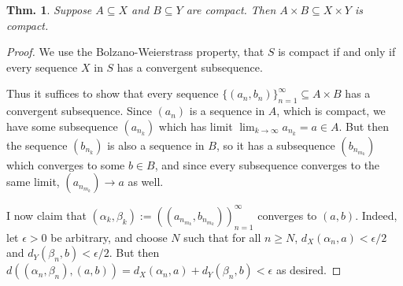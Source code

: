 \documentclass[12pt, a4paper]{book}
\newtheorem{theorem}{Thm.}[section]
\theoremstyle{nonumberplain}
\newtheorem{proof}{Proof}
\begin{document}
\begin{theorem}
    Suppose $A\subseteq X$ and $B\subseteq Y$ are compact.
    Then $A\times B\subseteq X\times Y$ is compact.
\end{theorem}
\begin{proof}
    We use the Bolzano-Weierstrass property, that $S$ is compact if and only if every sequence $X$ in $S$
    has a convergent subsequence.

    Thus it suffices to show that every sequence $\{(a_n,b_n)\}_{n=1}^\infty\subseteq A\times B$
    has a convergent subsequence. Since $(a_n)$ is a sequence in $A$, which is compact, we have some
    subsequence $(a_{n_k})$ which has limit $\lim_{k\to\infty}a_{n_k}=a\in A$. But then
    the sequence $(b_{n_k})$ is also a sequence in $B$, so it has a subsequence $(b_{n_{m_k}})$ which
    converges to some $b\in B$, and since every subsequence converges to the same limit, $(a_{n_{m_k}})\to a$
    as well.

    I now claim that $(\alpha_k,\beta_k):=((a_{n_{m_k}},b_{n_{m_k}}))_{n=1}^\infty$ converges to $(a,b)$.
    Indeed, let $\epsilon>0$ be arbitrary, and choose $N$ such that for all $n\geq N$, $d_X(\alpha_n,a)<\epsilon/2$
    and $d_Y(\beta_n,b)<\epsilon/2$. But then $d( (\alpha_n,\beta_n),(a,b) )= d_X(\alpha_n,a)+d_Y(\beta_n,b)<\epsilon$
    as desired.
\end{proof}
\end{document}

